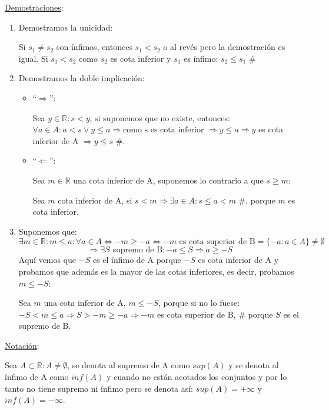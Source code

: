\documentclass[10pt,a4paper,openright]{book}
\begin{document}
\underline{Demostraciones}:

\begin{enumerate}
\item Demostramos la unicidad:\par
Si $s_1\neq s_2$ son ínfimos, entonces $s_1<s_2$ o al revés pero la demostración es igual. Si $s_1<s_2$ como $s_2$ es cota inferior y $s_1$ es ínfimo: $s_2\leq s_1$ \#

\item Demostramos la doble implicación:
	\begin{itemize}
	\item ``$\Rightarrow$'':\par
	Sea $y\in \mathbb R: s<y$, si suponemos que no existe, entonces: $\forall a \in  A: a<s\vee y\leq a\Rightarrow\mbox{como s es cota inferior }\Rightarrow  y\leq a\Rightarrow y$ es cota inferior de A $\Rightarrow y\leq s$ \#.
	\item ``$\Leftarrow$'':\par
	Sea $m\in \mathbb R$ una cota inferior de A, suponemos lo contrario a que $s\geq m$:\par
	Sea $m$ cota inferior de A, si $s<m\Rightarrow \exists a\in A: s\leq a<m$ \#, porque $m$ es cota inferior.
	\end{itemize}
	
\item Suponemos que:
$$\exists m\in \mathbb R: m\leq a: \forall a\in A\Leftrightarrow -m\geq -a\Leftrightarrow -m\mbox{ es cota superior de B}=\{-a: a\in A\}\neq \emptyset$$
$$\Rightarrow \exists S\mbox{ supremo de B}: -a\leq S\Rightarrow a\geq -S$$
Aquí vemos que $-S$ es el ínfimo de A porque $-S$ es cota inferior de A y probamos que además es la mayor de las cotas inferiores, es decir, probamos $m\leq -S$:\par
Sea $m$ una cota inferior de A, $m\leq -S$, porque si no lo fuese:
$-S<m\leq a\Rightarrow S>-m\geq -a\Rightarrow -m$ es cota superior de B, \# porque $S$ es el supremo de B.
\end{enumerate}

\underline{Notación}:\par
Sea $A\subset \mathbb R: A\neq \emptyset$, se denota al supremo de A como $sup(A)$ y se denota al ínfimo de A como $inf(A)$ y cuando no están acotados los conjuntos y por lo tanto no tiene supremo ni ínfimo pero se denota así: $sup(A)=+\infty$ y $inf(A)=-\infty$.
\end{document}
